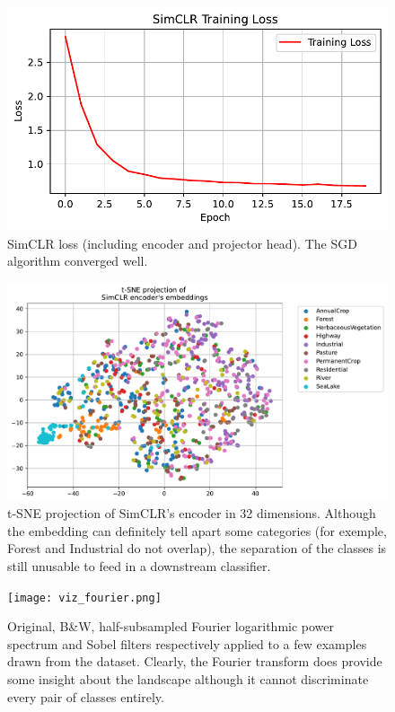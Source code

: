 \documentclass{article}
\begin{document}
\begin{figure}[h]
    \centering
    \includegraphics[scale=.6]{losses_simclr.pdf}
    \caption{SimCLR loss (including encoder and projector head). The SGD algorithm converged well.}
    \label{fig:simclr_loss}
\end{figure}

\begin{figure}[h]
    \centering
    \includegraphics[scale=.6]{tsne.pdf}
    \caption{t-SNE projection of SimCLR's encoder in 32 dimensions. Although the embedding can definitely tell apart some categories (for exemple, Forest and Industrial do not overlap), the separation of the classes is still unusable to feed in a downstream classifier.}
    \label{fig:tsne}
\end{figure}


\begin{figure}[h]
    \centering
    \texttt{[image: viz\_fourier.png]}
    \caption{Original, B\&W, half-subsampled Fourier logarithmic power spectrum and Sobel filters respectively applied to a few examples drawn from the dataset. Clearly, the Fourier transform does provide some insight about the landscape although it cannot discriminate every pair of classes entirely.}
    \label{fig:sobel_fourier}
\end{figure}
\end{document}
